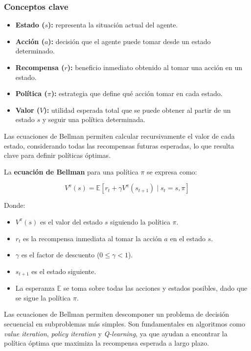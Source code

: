 \subsubsection*{Conceptos clave}

\begin{itemize}
    \item \textbf{Estado ($s$):} representa la situación actual del agente.
    \item \textbf{Acción ($a$):} decisión que el agente puede tomar desde un estado determinado.
    \item \textbf{Recompensa ($r$):} beneficio inmediato obtenido al tomar una acción en un estado.
    \item \textbf{Política ($\pi$):} estrategia que define qué acción tomar en cada estado.
    \item \textbf{Valor ($V$):} utilidad esperada total que se puede obtener al partir de un estado $s$ y seguir una política determinada.
\end{itemize}

Las ecuaciones de Bellman permiten calcular recursivamente el valor de cada estado, considerando todas las recompensas futuras esperadas, lo que resulta clave para definir políticas óptimas.

La \textbf{ecuación de Bellman} para una política $\pi$ se expresa como:

\[
V^{\pi}(s) = \mathbb{E} \left[ r_t + \gamma V^{\pi}(s_{t+1}) \mid s_t = s, \pi \right]
\]

Donde:
\begin{itemize}
    \item $V^{\pi}(s)$ es el valor del estado $s$ siguiendo la política $\pi$.
    \item $r_t$ es la recompensa inmediata al tomar la acción $a$ en el estado $s$.
    \item $\gamma$ es el factor de descuento ($0 \leq \gamma < 1$).
    \item $s_{t+1}$ es el estado siguiente.
    \item La esperanza $\mathbb{E}$ se toma sobre todas las acciones y estados posibles, dado que se sigue la política $\pi$.
\end{itemize}

Las ecuaciones de Bellman permiten descomponer un problema de decisión secuencial en subproblemas más simples. Son fundamentales en algoritmos como \textit{value iteration}, \textit{policy iteration} y \textit{Q-learning}, ya que ayudan a encontrar la política óptima que maximiza la recompensa esperada a largo plazo.







